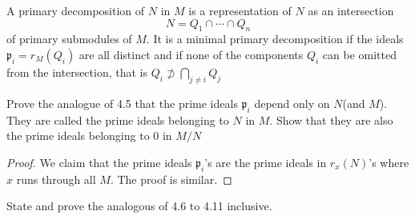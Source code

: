 \documentclass{solution}
\begin{document}
\begin{problem}
    A primary decomposition of $N$ in $M$ is a representation of $N$ as an intersection
    $$N = Q_1 \cap \cdots \cap Q_n$$
    of primary submodules of $M$. It is a minimal primary decomposition if the ideals $\mathfrak{p}_i = r_M(Q_i)$ are all distinct and if none of the components $Q_i$ can be omitted from the intersection, that is $Q_i \not\supset \bigcap\limits_{j \ne i} Q_j$

    Prove the analogue of 4.5 that the prime ideals $\mathfrak{p}_i$ depend only on $N$(and $M$). They are called the prime ideals belonging to $N$ in $M$. Show that they are also the prime ideals belonging to $0$ in $M / N$
\end{problem}

\begin{proof}
    We claim that the prime ideals $\mathfrak{p}_i$'s are the prime ideals in $r_x(N)$'s where $x$ runs through all $M$. The proof is similar.
\end{proof}

\begin{problem}
    State and prove the analogous of 4.6 to 4.11 inclusive.
\end{problem}
\end{document}
